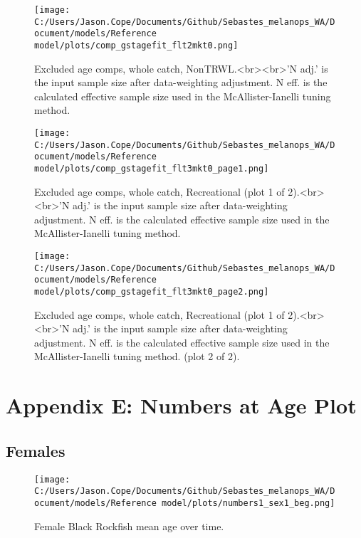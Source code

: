 \documentclass[11pt,
  letterpaper,
]{article}
\begin{document}
\begin{figure}
{\centering
\texttt{[image: C:/Users/Jason.Cope/Documents/Github/Sebastes\_melanops\_WA/Document/models/Reference model/plots/comp\_gstagefit\_flt2mkt0.png]}
}
\caption{Excluded age comps, whole catch, NonTRWL.<br><br>'N adj.' is the input sample size after data-weighting adjustment. N eff. is the calculated effective sample size used in the McAllister-Ianelli tuning method.\label{fig:comp_gstagefit_flt2mkt0}}
\end{figure}

\begin{figure}
{\centering
\texttt{[image: C:/Users/Jason.Cope/Documents/Github/Sebastes\_melanops\_WA/Document/models/Reference model/plots/comp\_gstagefit\_flt3mkt0\_page1.png]}
}
\caption{Excluded age comps, whole catch, Recreational (plot 1 of 2).<br><br>'N adj.' is the input sample size after data-weighting adjustment. N eff. is the calculated effective sample size used in the McAllister-Ianelli tuning method.\label{fig:comp_gstagefit_flt3mkt0_page1}}
\end{figure}

\begin{figure}
{\centering
\texttt{[image: C:/Users/Jason.Cope/Documents/Github/Sebastes\_melanops\_WA/Document/models/Reference model/plots/comp\_gstagefit\_flt3mkt0\_page2.png]}
}
\caption{Excluded age comps, whole catch, Recreational (plot 1 of 2).<br><br>'N adj.' is the input sample size after data-weighting adjustment. N eff. is the calculated effective sample size used in the McAllister-Ianelli tuning method. (plot 2 of 2).\label{fig:comp_gstagefit_flt3mkt0_page2}}
\end{figure}

\clearpage

\hypertarget{app-e}{%
\section{Appendix E: Numbers at Age Plot}\label{app-e}}

\hypertarget{females}{%
\subsection{Females}\label{females}}

\begin{figure}
{\centering
\texttt{[image: C:/Users/Jason.Cope/Documents/Github/Sebastes\_melanops\_WA/Document/models/Reference model/plots/numbers1\_sex1\_beg.png]}
}
\caption{Female Black Rockfish mean age over time.\label{fig:num_age_females}}
\end{figure}
\end{document}
